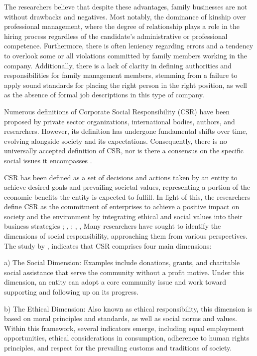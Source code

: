\documentclass[10pt]{NSP1}
\begin{document}
The researchers believe that despite these advantages, family businesses are not without drawbacks and negatives. Most notably, the dominance of kinship over professional management, where the degree of relationship plays a role in the hiring process regardless of the candidate’s administrative or professional competence. Furthermore, there is often leniency regarding errors and a tendency to overlook some or all violations committed by family members working in the company. Additionally, there is a lack of clarity in defining authorities and responsibilities for family management members, stemming from a failure to apply sound standards for placing the right person in the right position, as well as the absence of formal job descriptions in this type of company.

\par\medskip{}\smallskip

Numerous definitions of Corporate Social Responsibility (CSR) have been proposed by private sector organizations, international bodies, authors, and researchers. However, its definition has undergone fundamental shifts over time, evolving alongside society and its expectations. Consequently, there is no universally accepted definition of CSR, nor is there a consensus on the specific social issues it encompasses \cite{ref5}.

CSR has been defined as a set of decisions and actions taken by an entity to achieve desired goals and prevailing societal values, representing a portion of the economic benefits the entity is expected to fulfill. In light of this, the researchers define CSR as the commitment of enterprises to achieve a positive impact on society and the environment by integrating ethical and social values into their business strategies \cite{ref6}; \cite{ref20}, ; \cite{ref40}, \cite{ref39}, Many researchers have sought to identify the dimensions of social responsibility, approaching them from various perspectives. The study by \cite{ref25}, indicates that CSR comprises four main dimensions:

a) The Social Dimension: Examples include donations, grants, and charitable social assistance that serve the community without a profit motive. Under this dimension, an entity can adopt a core community issue and work toward supporting and following up on its progress.

b) The Ethical Dimension: Also known as ethical responsibility, this dimension is based on moral principles and standards, as well as social norms and values. Within this framework, several indicators emerge, including equal employment opportunities, ethical considerations in consumption, adherence to human rights principles, and respect for the prevailing customs and traditions of society.
\end{document}
